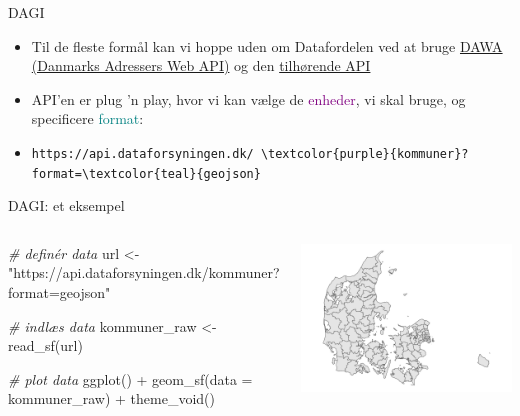 \documentclass[
  8pt,
  ignorenonframetext,
  aspectratio=169]{beamer}
\newenvironment{Shaded}{}{}
\newcommand{\AttributeTok}[1]{\textcolor[rgb]{0.49,0.56,0.16}{#1}}
\newcommand{\CommentTok}[1]{\textcolor[rgb]{0.38,0.63,0.69}{\textit{#1}}}
\newcommand{\FunctionTok}[1]{\textcolor[rgb]{0.02,0.16,0.49}{#1}}
\newcommand{\NormalTok}[1]{#1}
\newcommand{\OtherTok}[1]{\textcolor[rgb]{0.00,0.44,0.13}{#1}}
\newcommand{\SpecialCharTok}[1]{\textcolor[rgb]{0.25,0.44,0.63}{#1}}
\newcommand{\StringTok}[1]{\textcolor[rgb]{0.25,0.44,0.63}{#1}}
\newcommand{\columnsbegin}{\begin{columns}}
\newcommand{\columnsend}{\end{columns}}
\begin{document}
\begin{frame}{DAGI}
\protect\hypertarget{dagi-1}{}
\begin{itemize}
\item
  Til de fleste formål kan vi hoppe uden om Datafordelen ved at bruge
  \href{https://dawadocs.dataforsyningen.dk/dok/dagi}{DAWA (Danmarks
  Adressers Web API)} og den
  \href{https://dawadocs.dataforsyningen.dk/dok/api\#dagi}{tilhørende
  API}
\item
  API'en er plug 'n play, hvor vi kan vælge de
  \textcolor{purple}{enheder}, vi skal bruge, og specificere
  \textcolor{teal}{format}:
\item
  \nolinkurl{https://api.dataforsyningen.dk/ \textcolor{purple}{kommuner}?format=\textcolor{teal}{geojson}}
\end{itemize}
\end{frame}

\begin{frame}[fragile]{DAGI: et eksempel}
\protect\hypertarget{dagi-et-eksempel}{}
\columnsbegin
{}

\tiny

\begin{Shaded}
\begin{Highlighting}[]
\CommentTok{\# definér data}
\NormalTok{url }\OtherTok{\textless{}{-}} 
  \StringTok{"https://api.dataforsyningen.dk/kommuner?format=geojson"}

\CommentTok{\# indlæs data}
\NormalTok{kommuner\_raw }\OtherTok{\textless{}{-}} 
  \FunctionTok{read\_sf}\NormalTok{(url)}

\CommentTok{\# plot data}
\FunctionTok{ggplot}\NormalTok{() }\SpecialCharTok{+}
  \FunctionTok{geom\_sf}\NormalTok{(}\AttributeTok{data =}\NormalTok{ kommuner\_raw) }\SpecialCharTok{+}
  \FunctionTok{theme\_void}\NormalTok{()}
\end{Highlighting}
\end{Shaded}

\normalsize {}

\tiny

\includegraphics{crashcourse_slides_files/figure-beamer/unnamed-chunk-26-1.pdf}

\normalsize \columnsend
\end{frame}
\end{document}
